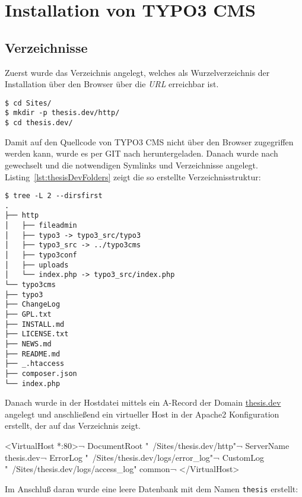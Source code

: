 \section{Installation von TYPO3 CMS}
\label{prototype:sec:installTYPO3}
\subsection{Verzeichnisse}
Zuerst wurde das Verzeichnis  angelegt, welches als Wurzelverzeichnis der Installation über den Browser über die \textit{URL} erreichbar ist.

\begin{Verbatim}[samepage=true]
$ cd Sites/
$ mkdir -p thesis.dev/http/
$ cd thesis.dev/
\end{Verbatim}


Damit auf den Quellcode von TYPO3 CMS nicht über den Browser zugegriffen werden kann, wurde es per GIT nach  heruntergeladen. Danach wurde nach  gewechselt und die notwendigen Symlinks und Verzeichnisse angelegt. Listing~\ref{lst:thesisDevFolders} zeigt die so erstellte Verzeichnisstruktur:

\begin{Verbatim}[samepage=true]
$ tree -L 2 --dirsfirst
.
├── http
│   ├── fileadmin
│   ├── typo3 -> typo3_src/typo3
│   ├── typo3_src -> ../typo3cms
│   ├── typo3conf
│   ├── uploads
│   └── index.php -> typo3_src/index.php
└── typo3cms
├── typo3
├── ChangeLog
├── GPL.txt
├── INSTALL.md
├── LICENSE.txt
├── NEWS.md
├── README.md
├── _.htaccess
├── composer.json
└── index.php
\end{Verbatim}

Danach wurde in der Hostdatei mittels  ein A-Record der Domain \url{thesis.dev} angelegt und anschließend ein virtueller Host in der Apache2 Konfiguration erstellt, der auf das Verzeichnis  zeigt.

\begin{shcode}
<VirtualHost *:80>¬
DocumentRoot "~/Sites/thesis.dev/http"¬
ServerName thesis.dev¬
ErrorLog "~/Sites/thesis.dev/logs/error_log"¬
CustomLog "~/Sites/thesis.dev/logs/access_log" common¬
</VirtualHost>
\end{shcode}

Im Anschluß daran wurde eine leere Datenbank mit dem Namen \texttt{thesis} erstellt:

